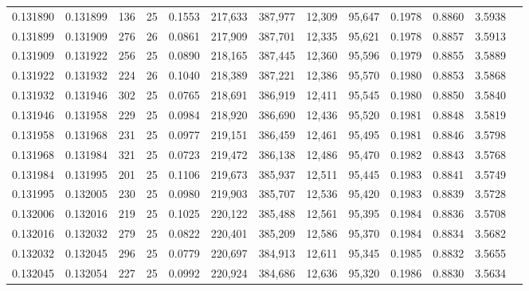 \begin{tabular}{rrrrrrrrrrrrr}
0.131890 & 0.131899 &   136 &  25 &                                     0.1553 & 217,633 & 387,977 &  12,309 &  95,647 & 0.1978 & 0.8860 & 3.5938 \\
0.131899 & 0.131909 &   276 &  26 &                                     0.0861 & 217,909 & 387,701 &  12,335 &  95,621 & 0.1978 & 0.8857 & 3.5913 \\
0.131909 & 0.131922 &   256 &  25 &                                     0.0890 & 218,165 & 387,445 &  12,360 &  95,596 & 0.1979 & 0.8855 & 3.5889 \\
0.131922 & 0.131932 &   224 &  26 &                                     0.1040 & 218,389 & 387,221 &  12,386 &  95,570 & 0.1980 & 0.8853 & 3.5868 \\
0.131932 & 0.131946 &   302 &  25 &                                     0.0765 & 218,691 & 386,919 &  12,411 &  95,545 & 0.1980 & 0.8850 & 3.5840 \\
0.131946 & 0.131958 &   229 &  25 &                                     0.0984 & 218,920 & 386,690 &  12,436 &  95,520 & 0.1981 & 0.8848 & 3.5819 \\
0.131958 & 0.131968 &   231 &  25 &                                     0.0977 & 219,151 & 386,459 &  12,461 &  95,495 & 0.1981 & 0.8846 & 3.5798 \\
0.131968 & 0.131984 &   321 &  25 &                                     0.0723 & 219,472 & 386,138 &  12,486 &  95,470 & 0.1982 & 0.8843 & 3.5768 \\
0.131984 & 0.131995 &   201 &  25 &                                     0.1106 & 219,673 & 385,937 &  12,511 &  95,445 & 0.1983 & 0.8841 & 3.5749 \\
0.131995 & 0.132005 &   230 &  25 &                                     0.0980 & 219,903 & 385,707 &  12,536 &  95,420 & 0.1983 & 0.8839 & 3.5728 \\
0.132006 & 0.132016 &   219 &  25 &                                     0.1025 & 220,122 & 385,488 &  12,561 &  95,395 & 0.1984 & 0.8836 & 3.5708 \\
0.132016 & 0.132032 &   279 &  25 &                                     0.0822 & 220,401 & 385,209 &  12,586 &  95,370 & 0.1984 & 0.8834 & 3.5682 \\
0.132032 & 0.132045 &   296 &  25 &                                     0.0779 & 220,697 & 384,913 &  12,611 &  95,345 & 0.1985 & 0.8832 & 3.5655 \\
0.132045 & 0.132054 &   227 &  25 &                                     0.0992 & 220,924 & 384,686 &  12,636 &  95,320 & 0.1986 & 0.8830 & 3.5634 \\

\end{tabular}
